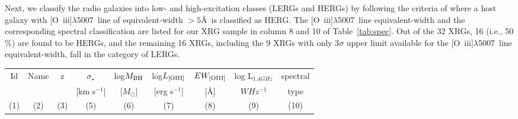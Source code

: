 \documentclass[twocolumn]{aastex62}
\def\oiiib{[O~{\sc iii}]$\lambda$5007~}
\def\kms{km s$^{-1}$}
\begin{document}
 Next,  we classify the radio galaxies into low- and high-excitation
 classes (LERGs and HERGs)  by following the criteria of \citet{Best2012MNRAS.421.1569B} 
 where a host galaxy with \oiiib line of equivalent-width $> 5$\AA\ is 
 classified as HERG. The \oiiib line equivalent-width and the corresponding 
 spectral classification are listed for our XRG sample in column 8 and 10 
 of Table~\ref{tab:spec}. Out of the 32 XRGs, 16 (i.e., 50 \%) are found 
 to be HERGs, and the remaining 16 XRGs, including the 9 XRGs with only 
 3$\sigma$ upper limit available for the \oiiib line equivalent-width, 
 fall in the category of LERGs.



 \begin{table*}
 \centering
 \begin{minipage}{180mm}
 {\scriptsize
 \caption{Optical spectral parameters of the X-shaped radio galaxies.} 
 \label{tab:spec}
 \begin{tabular}{@{} r c r r r r r c  c @{}}
 \hline  \hline 
  \multicolumn{1}{c}{Id}   &\multicolumn{1}{c}{Name}  &       \multicolumn{1}{c}{z} & \multicolumn{1}{c}{$\sigma_{\star}$} & \multicolumn{1}{c}{log$M_{\rm BH}$} &\multicolumn{1}{c}{log$L_{\rm [OIII]}$ }& \multicolumn{1}{c}{$EW_{\rm [OIII]}$} & \multicolumn{1}{c}{log L$_{1.4 GHz}$} & \multicolumn{1}{c}{spectral} \\
  \multicolumn{1}{c}{  }   &\multicolumn{1}{c}{   }  &    \multicolumn{1}{c}{ } &   \multicolumn{1}{c}{[\kms] }&   \multicolumn{1}{c}{[$M_{\odot}$] } & \multicolumn{1}{c}{ [erg s$^{-1}$]    } &\multicolumn{1}{c}{[\AA]  }& \multicolumn{1}{c}{$W Hz^{-1}$} & \multicolumn{1}{c}{ type}  \\
 \multicolumn{1}{c}{(1)}  &\multicolumn{1}{c}{ (2) }  &    \multicolumn{1}{c}{(3)} &   \multicolumn{1}{c}{(5)}&   \multicolumn{1}{c}{(6)} & \multicolumn{1}{c}{ (7)  } &\multicolumn{1}{c}{(8)}& \multicolumn{1}{c}{(9)} & \multicolumn{1}{c}{ (10)}  \\
\hline 


\end{tabular}}
\end{minipage}
\end{table*}
\end{document}
